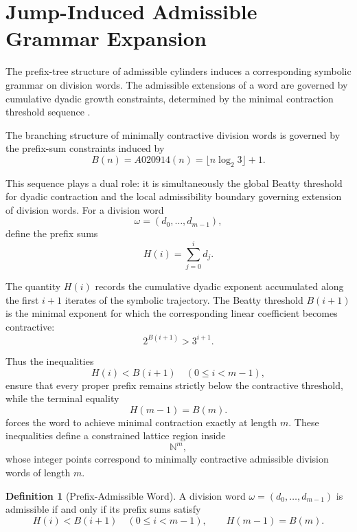 \documentclass[12pt, oneside]{article}
\numberwithin{equation}{section}
\theoremstyle{definition}
\newtheorem{definition}{Definition}[section]
\theoremstyle{plain}
\theoremstyle{remark}
\begin{document}


\section{Jump-Induced Admissible Grammar Expansion}
\label{sec:jump-expansion}

The prefix-tree structure of admissible cylinders induces a corresponding
symbolic grammar on division words. The admissible extensions of a word
are governed by cumulative dyadic growth constraints, determined by the
minimal contraction threshold sequence .

The branching structure of minimally contractive division words is governed
by the prefix-sum constraints induced by
\[
B(n)=A020914(n)=\lfloor n\log_2 3\rfloor+1.
\]

This sequence plays a dual role: it is simultaneously the global Beatty
threshold for dyadic contraction and the local admissibility boundary
governing extension of division words.  For a division word
\[
\omega=(d_0,\dots,d_{m-1}),
\]
define the prefix sums
\[
H(i)=\sum_{j=0}^{i} d_j.
\]

The quantity \(H(i)\) records the cumulative dyadic exponent accumulated
along the first \(i+1\) iterates of the symbolic trajectory. The Beatty
threshold \(B(i+1)\) is the minimal exponent for which the corresponding
linear coefficient becomes contractive:
\[
2^{B(i+1)}>3^{i+1}.
\]

Thus the inequalities
\[
H(i)<B(i+1)
\quad (0\le i<m-1),
\]
ensure that every proper prefix remains strictly below the contractive
threshold, while the terminal equality
\[
H(m-1)=B(m).
\]
forces the word to achieve minimal contraction exactly at length \(m\).
These inequalities define a constrained lattice region inside
\[
\mathbb{N}^m,
\]
whose integer points correspond to minimally contractive admissible
division words of length \(m\).

\begin{definition}[Prefix-Admissible Word]
A division word $\omega=(d_0,\dots,d_{m-1})$ is admissible if and only if
its prefix sums satisfy
\[
H(i) < B(i+1) \quad (0 \le i < m-1),
\qquad
H(m-1)=B(m).
\]
\end{definition}

\end{document}
